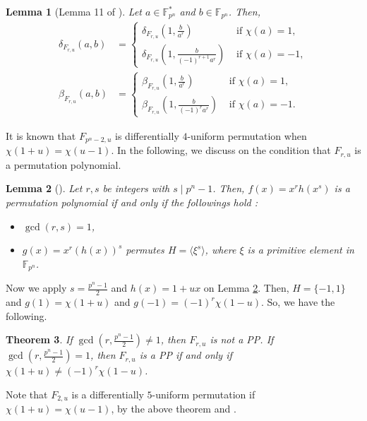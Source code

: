 \documentclass[11pt]{article}
\newtheorem{theorem}{Theorem}[section]
\numberwithin{theorem}{section}
\newtheorem{lemma}[theorem]{Lemma}
\newcommand{\Fpn}{\mathbb{F}_{p^n}}
\newcommand{\Fpnmul}{\mathbb{F}_{p^n}^*}
\begin{document}
\begin{lemma}[Lemma 11 of \cite{MW25}]\label{Fruproperty2_lemma}
	Let $a\in \Fpnmul$ and $b\in \Fpn$. Then,
	\begin{align*}
		\delta_{F_{r,u}}(a,b)&=
		\begin{cases}
			\delta_{F_{r,u}}\left( 1, \frac{b}{a^r}\right) &\text{ if }\chi(a)=1,\\
			\delta_{F_{r,u}}\left( 1, \frac{b}{(-1)^{r+1}a^r}\right) &\text{ if }\chi(a)=-1,
		\end{cases}
		\\
		\beta_{F_{r,u}}(a,b)&=
		\begin{cases}
			\beta_{F_{r,u}}\left( 1, \frac{b}{a^r}\right) &\text{ if }\chi(a)=1,\\
			\beta_{F_{r,u}}\left( 1, \frac{b}{(-1)^{r}a^r}\right) &\text{ if }\chi(a)=-1.
		\end{cases}
	\end{align*}
\end{lemma}


It is known \cite{LWZ24} that $F_{p^n-2,u}$ is differentially $4$-uniform permutation when $\chi(1+u)=\chi(u-1)$. In the following, we discuss on the condition that $F_{r,u}$ is a permutation polynomial. 

\begin{lemma}[\cite{PL01}]\label{PP_lemma}
	 Let $r,s$ be integers with $s\mid p^n-1$. Then, $f(x)=x^r h(x^s)$ is a permutation polynomial if and only if the followings hold :
	\begin{itemize}
		\item $\gcd(r,s)=1$,
		\item $g(x)=x^r \left( h(x)\right)^s$ permutes $H=\langle \xi^s\rangle$, where $\xi$ is a primitive element in $\Fpn$. 
	\end{itemize}
\end{lemma}

Now we apply $s=\frac{p^n-1}{2}$ and $h(x)=1+ux$ on Lemma \ref{PP_lemma}. Then, $H=\{-1,1\}$ and $g(1)=\chi(1+u)$ and $g(-1)=(-1)^r\chi(1-u)$. So, we have the following.

\begin{theorem}\label{Fru_PP_thm}
	If $\gcd\left( r,\frac{p^n-1}{2}\right) \ne 1$, then $F_{r,u}$ is not a PP. If $\gcd\left( r,\frac{p^n-1}{2}\right) = 1$, then $F_{r,u}$ is a PP if and only if $\chi(1+u)\ne (-1)^r \chi(1-u)$.	
\end{theorem}

Note that $F_{2,u}$ is a differentially $5$-uniform permutation if $\chi(1+u)=\chi(u-1)$, by the above theorem and \cite{MW25}.
\end{document}

